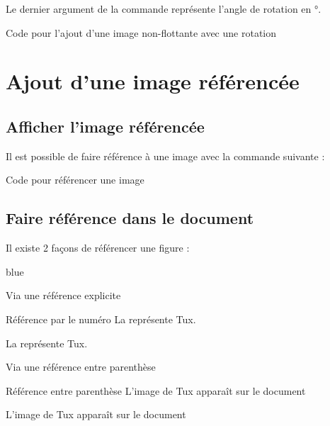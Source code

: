 Le dernier argument de la commande représente l'angle de rotation en °.

\begin{Latex}{Code pour l'ajout d'une image non-flottante avec une rotation}
\end{Latex}


\section{Ajout d'une image référencée}

\subsection{Afficher l'image référencée}

Il est possible de faire référence à une image avec la commande suivante : 

\begin{Latex}{Code pour référencer une image}
\end{Latex}


\subsection{Faire référence dans le document}

Il existe 2 façons de référencer une figure : 

\begin{items}{blue}{\Triangle}
    \item Via une référence explicite
    \begin{Latex}{Référence par le numéro}
La  représente Tux.
\end{Latex}
    La  représente Tux.
    \item Via une référence entre parenthèse
\begin{Latex}{Référence entre parenthèse}
L'image de Tux apparaît sur le document 
\end{Latex}
    L'image de Tux apparaît sur le document 
  \end{items}

